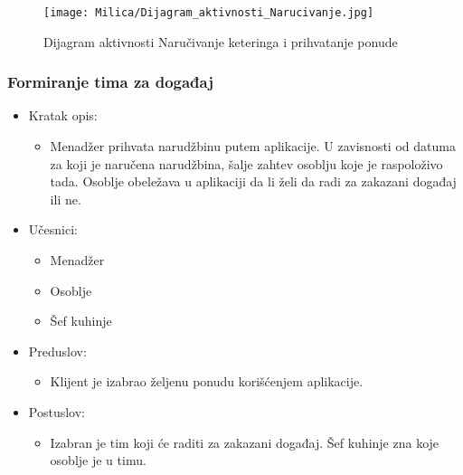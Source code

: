 \documentclass[a4paper]{article}
\begin{document}
   
    
\begin{figure}[H]
    \centering
    \texttt{[image: Milica/Dijagram\_aktivnosti\_Narucivanje.jpg]}
    \caption{Dijagram aktivnosti Naručivanje keteringa i prihvatanje ponude}
    \label{fig:RegistracijaZ}
\end{figure}

    


\subsubsection{Formiranje tima za događaj}
\begin{itemize}
    \item Kratak opis:
    \begin{itemize}
        \item 
        Menadžer prihvata narudžbinu putem aplikacije. U zavisnosti od datuma za koji je naručena narudžbina, šalje zahtev osoblju koje je raspoloživo tada. Osoblje obeležava u aplikaciji da li želi da radi za zakazani događaj ili ne.
    \end{itemize}
\end{itemize}
  \begin{itemize}
        \item Učesnici:
          \begin{itemize}
        \item Menadžer
    \end{itemize}
      \begin{itemize}
        \item Osoblje
    \end{itemize}
    \begin{itemize}
        \item Šef kuhinje
    \end{itemize}
    \end{itemize}
      \begin{itemize}
        \item Preduslov:
          \begin{itemize}
        \item  Klijent je izabrao željenu ponudu korišćenjem aplikacije.
    \end{itemize}
    
    \end{itemize}
      \begin{itemize}
        \item Postuslov:
          \begin{itemize}
        \item Izabran je tim koji će raditi za zakazani događaj. Šef kuhinje zna koje osoblje je u timu.
    \end{itemize}
    \end{itemize}
\end{document}
